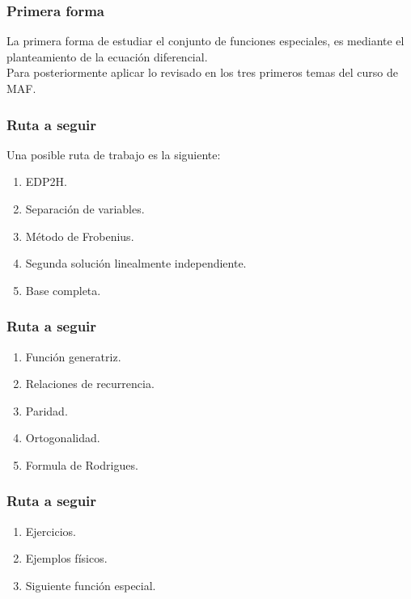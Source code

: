 \documentclass[12pt]{beamer}
\begin{document}
\begin{frame}
\frametitle{Primera forma}
La primera forma de estudiar el conjunto de funciones especiales, es mediante el planteamiento de la ecuación diferencial.
\\
\bigskip
\pause
Para posteriormente aplicar lo revisado en los tres primeros temas del curso de MAF.
\end{frame}
\begin{frame}
\frametitle{Ruta a seguir}
Una posible ruta de trabajo es la siguiente:
\begin{enumerate}[<+->]
\item EDP2H.
\item Separación de variables.
\item Método de Frobenius.
\item Segunda solución linealmente independiente.
\item Base completa.
\seti
\end{enumerate}
\end{frame}
\begin{frame}
\frametitle{Ruta a seguir}
\begin{enumerate}[<+->]
\conti
\item Función generatriz.
\item Relaciones de recurrencia.
\item Paridad.
\item Ortogonalidad.
\item Formula de Rodrigues.
\seti
\end{enumerate}
\end{frame}
\begin{frame}
\frametitle{Ruta a seguir}
\begin{enumerate}[<+->]
\conti
\item Ejercicios.
\item Ejemplos físicos.
\item Siguiente función especial.
\end{enumerate}
\end{frame}
\end{document}
